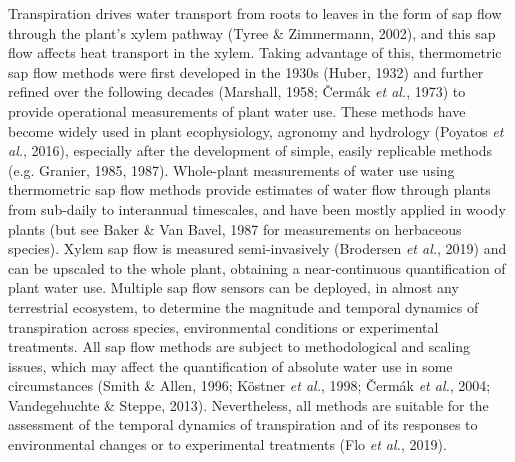 \documentclass[11pt,twoside]{reedthesis}
\begin{document}
Transpiration drives water transport from roots to leaves in the form of
sap flow through the plant's xylem pathway (Tyree \& Zimmermann, 2002),
and this sap flow affects heat transport in the xylem. Taking advantage
of this, thermometric sap flow methods were first developed in the 1930s
(Huber, 1932) and further refined over the following decades (Marshall,
1958; Čermák \emph{et al.}, 1973) to provide operational measurements of
plant water use. These methods have become widely used in plant
ecophysiology, agronomy and hydrology (Poyatos \emph{et al.}, 2016),
especially after the development of simple, easily replicable methods
(e.g. Granier, 1985, 1987). Whole-plant measurements of water use using
thermometric sap flow methods provide estimates of water flow through
plants from sub-daily to interannual timescales, and have been mostly
applied in woody plants (but see Baker \& Van Bavel, 1987 for
measurements on herbaceous species). Xylem sap flow is measured
semi-invasively (Brodersen \emph{et al.}, 2019) and can be upscaled to
the whole plant, obtaining a near-continuous quantification of plant
water use. Multiple sap flow sensors can be deployed, in almost any
terrestrial ecosystem, to determine the magnitude and temporal dynamics
of transpiration across species, environmental conditions or
experimental treatments. All sap flow methods are subject to
methodological and scaling issues, which may affect the quantification
of absolute water use in some circumstances (Smith \& Allen, 1996;
Köstner \emph{et al.}, 1998; Čermák \emph{et al.}, 2004; Vandegehuchte
\& Steppe, 2013). Nevertheless, all methods are suitable for the
assessment of the temporal dynamics of transpiration and of its
responses to environmental changes or to experimental treatments (Flo
\emph{et al.}, 2019).\par
\end{document}
